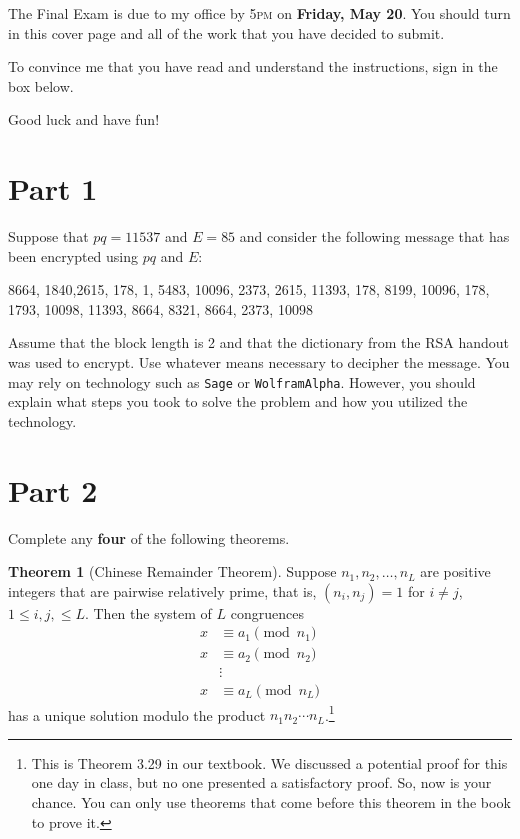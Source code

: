 \documentclass[11pt]{article}
\theoremstyle{definition}
\newtheorem{theorem}{Theorem}
\begin{document}
The Final Exam is due to my office by 5\textsc{pm} on \textbf{Friday, May 20}.  You should turn in this cover page and all of the work that you have decided to submit.

\bigskip

To convince me that you have read and understand the instructions, sign in the box below.

\bigskip


\bigskip

Good luck and have fun!

\newpage

\section*{Part 1}

Suppose that $pq=11537$ and $E=85$ and consider the following message that has been encrypted using $pq$ and $E$:
\begin{center}
8664, 1840,2615, 178, 1, 5483, 10096, 2373, 2615, 11393, 178, 8199, 10096, 178, 1793, 10098, 11393, 8664, 8321, 8664, 2373, 10098
\end{center}
Assume that the block length is 2 and that the dictionary from the RSA handout was used to encrypt.  Use whatever means necessary to decipher the message.  You may rely on technology such as \texttt{Sage} or \texttt{WolframAlpha}.  However, you should explain what steps you took to solve the problem and how you utilized the technology.  

\section*{Part 2}

Complete any \textbf{four} of the following theorems.

\begin{theorem}[Chinese Remainder Theorem]
Suppose $n_{1}, n_{2},\ldots, n_{L}$ are positive integers that are pairwise relatively prime, that is, $(n_{i},n_{j})=1$ for $i\neq j$, $1\leq i,j,\leq L$.  Then the system of $L$ congruences
\begin{align*}
x & \equiv a_{1} \pmod{n_{1}}\\
x & \equiv a_{2} \pmod{n_{2}}\\
& \vdots \\
x & \equiv  a_{L} \pmod{n_{L}}
\end{align*}
has a unique solution modulo the product $n_{1}n_{2}\cdots n_{L}$.\footnote{This is Theorem 3.29 in our textbook.  We discussed a potential proof for this one day in class, but no one presented a satisfactory proof.  So, now is your chance.  You can only use theorems that come before this theorem in the book to prove it.}
\end{theorem}
\end{document}
